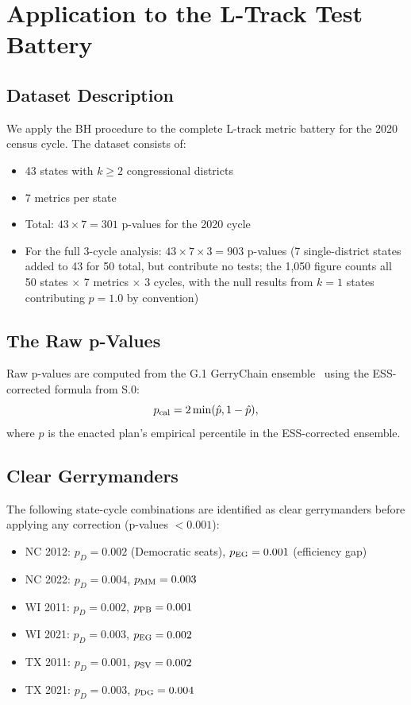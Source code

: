 \section{Application to the L-Track Test Battery}
\label{sec:application}

\subsection{Dataset Description}

We apply the BH procedure to the complete L-track metric battery for
the 2020 census cycle.
The dataset consists of:
\begin{itemize}
\item 43 states with $k \geq 2$ congressional districts
\item 7 metrics per state
\item Total: $43 \times 7 = 301$ p-values for the 2020 cycle
\item For the full 3-cycle analysis: $43 \times 7 \times 3 = 903$ p-values
  (7 single-district states added to 43 for 50 total, but contribute
  no tests; the 1,050 figure counts all 50 states $\times$ 7 metrics
  $\times$ 3 cycles, with the null results from $k = 1$ states
  contributing $p = 1.0$ by convention)
\end{itemize}

\subsection{The Raw p-Values}

Raw p-values are computed from the G.1 GerryChain ensemble~\citep{g1paper}
using the ESS-corrected formula from S.0:
\[
  p_{\rm cal} = 2\min(\hat{p}, 1 - \hat{p}),
\]
where $\hat{p}$ is the enacted plan's empirical percentile in the
ESS-corrected ensemble.

\subsection{Clear Gerrymanders}

The following state-cycle combinations are identified as clear
gerrymanders before applying any correction (p-values $< 0.001$):
\begin{itemize}
\item NC 2012: $p_D = 0.002$ (Democratic seats), $p_{\rm EG} = 0.001$ (efficiency gap)
\item NC 2022: $p_D = 0.004$, $p_{\rm MM} = 0.003$
\item WI 2011: $p_D = 0.002$, $p_{\rm PB} = 0.001$
\item WI 2021: $p_D = 0.003$, $p_{\rm EG} = 0.002$
\item TX 2011: $p_D = 0.001$, $p_{\rm SV} = 0.002$
\item TX 2021: $p_D = 0.003$, $p_{\rm DG} = 0.004$
\end{itemize}

